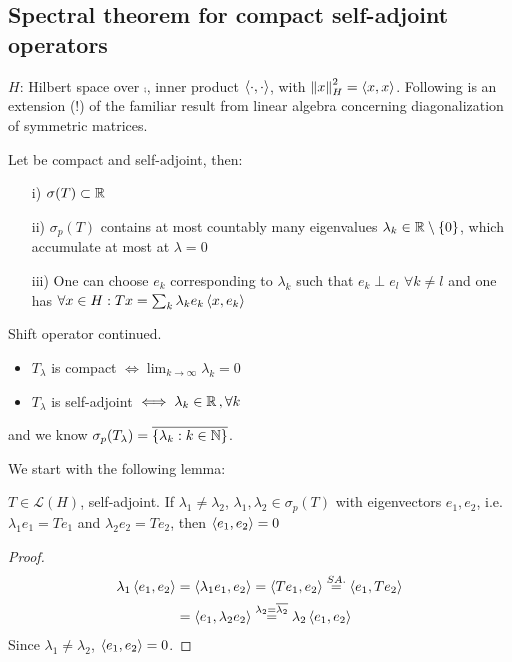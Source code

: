 \documentclass{article}
\begin{document}
\subsection{Spectral theorem for compact self-adjoint operators}
$H$: Hilbert space over $\comp$, inner product $\left<{\cdot},{\cdot}\right>$, with $\left\|{x}\right\|^2_H=\left<{x},{x}\right>$. Following is an extension (!) of the familiar result from linear algebra concerning diagonalization of symmetric matrices.
\begin{theorem}\nl
\label{riesz schauder}
	Let   be compact and self-adjoint, then:
	\begin{itemize}
		\item [i)] $\sigma(T)\subset\mathbb{R}$
		\item [ii)] $\sigma_p(T)$ contains at most countably many eigenvalues $\lambda_k\in\mathbb{R}\setminus\{0\}$, which accumulate at most at $\lambda=0$
		\item [iii)] One can choose $e_k$  corresponding to $\lambda_k$ such that $e_k\perp e_l$ $\forall k\neq l$ and one has $\forall x\in H:Tx=\sum_k \lambda_k e_k\left<{x},{e_k}\right>$
	\end{itemize}
\end{theorem}
\begin{example}\nl
	Shift operator  continued.\\
	\begin{itemize}
	    \item $T_\lambda$ is compact $\iff \lim_{k\to\infty}\lambda_k=0$
	    \item $T_\lambda$ is self-adjoint $\iff \lambda_k\in\mathbb{R}\,,\forall k$
	\end{itemize}
	 and we know $\sigma_p(T_\lambda)=\overline{\{\lambda_k:k\in\mathbb{N}\}}$.
\end{example}
We start with the following lemma:
\begin{lemma}[Lemma 1]
	$T\in\mathcal{L}(H)$, self-adjoint. If $\lambda_1\neq\lambda_2$, $\lambda_1,\lambda_2\in\sigma_p(T)$ with eigenvectors $e_1,e_2$, i.e. $\lambda_1 e_1=Te_1$ and $\lambda_2e_2=Te_2$, then $\left<{e_1},{e_2}\right>=0$
\end{lemma}
\begin{proof}
   		\begin{equation}
			\begin{split}
			\lambda_1\left<{e_1},{e_2}\right>&=\left<{\lambda_1e_1},{e_2}\right>=\left<{Te_1},{e_2}\right>\stackrel{SA.}{=}\left<{e_1},{Te_2}\right>\\
			&=\left<{e_1},{\lambda_2e_2}\right>\stackrel{\lambda_2=\overline{\lambda_2}}{=}\lambda_2\left<{e_1},{e_2}\right>
			\end{split}
		\end{equation}
		Since $\lambda_1\neq\lambda_2$, $\left<{e_1},{e_2}\right>=0$. 
\end{proof}
\end{document}

